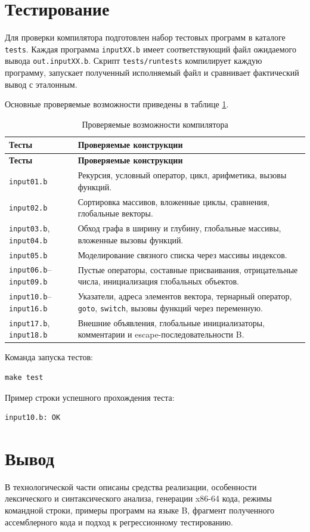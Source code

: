 \section{Тестирование}

Для проверки компилятора подготовлен набор тестовых программ в каталоге \texttt{tests}. Каждая программа \texttt{inputXX.b} имеет соответствующий файл ожидаемого вывода \texttt{out.inputXX.b}. Скрипт \texttt{tests/runtests} компилирует каждую программу, запускает полученный исполняемый файл и сравнивает фактический вывод с эталонным.

Основные проверяемые возможности приведены в таблице \ref{tbl:tests}.

\begin{longtable}{|p{4cm}|p{12cm}|}
  \caption{Проверяемые возможности компилятора}
  \label{tbl:tests} \\
  \hline
  \textbf{Тесты} & \textbf{Проверяемые конструкции} \\
  \hline
  \endfirsthead
  \hline
  \textbf{Тесты} & \textbf{Проверяемые конструкции} \\
  \hline
  \endhead
  \texttt{input01.b} & Рекурсия, условный оператор, цикл, арифметика, вызовы функций. \\
  \hline
  \texttt{input02.b} & Сортировка массивов, вложенные циклы, сравнения, глобальные векторы. \\
  \hline
  \texttt{input03.b}, \texttt{input04.b} & Обход графа в ширину и глубину, глобальные массивы, вложенные вызовы функций. \\
  \hline
  \texttt{input05.b} & Моделирование связного списка через массивы индексов. \\
  \hline
  \texttt{input06.b}--\texttt{input09.b} & Пустые операторы, составные присваивания, отрицательные числа, инициализация глобальных объектов. \\
  \hline
  \texttt{input10.b}--\texttt{input16.b} & Указатели, адреса элементов вектора, тернарный оператор, \texttt{goto}, \texttt{switch}, вызовы функций через переменную. \\
  \hline
  \texttt{input17.b}, \texttt{input18.b} & Внешние объявления, глобальные инициализаторы, комментарии и escape-последовательности B. \\
  \hline
\end{longtable}

Команда запуска тестов:

\begin{verbatim}
make test
\end{verbatim}

Пример строки успешного прохождения теста:

\begin{verbatim}
input10.b: OK
\end{verbatim}

\section{Вывод}

В технологической части описаны средства реализации, особенности лексического и синтаксического анализа, генерации x86-64 кода, режимы командной строки, примеры программ на языке B, фрагмент полученного ассемблерного кода и подход к регрессионному тестированию.

